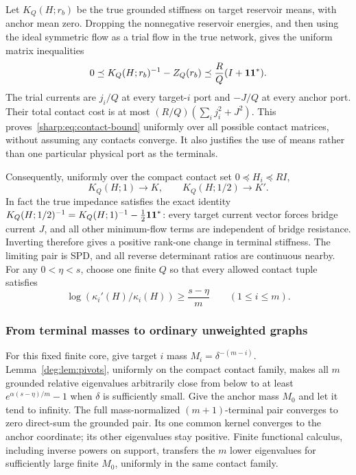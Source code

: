 Let $K_Q(H;r_b)$ be the true grounded stiffness on target reservoir
means, with anchor mean zero. Dropping the nonnegative reservoir
energies, and then using the ideal symmetric flow as a trial flow in
the true network, gives the uniform matrix inequalities
\begin{equation}\label{sharp:eq:contact-bound}
 0\preceq K_Q(H;r_b)^{-1}-Z_Q(r_b)
             \preceq\frac RQ(I+\boldsymbol 1\boldsymbol 1^*).
\end{equation}
The trial currents are $j_i/Q$ at every target-$i$ port and $-J/Q$
at every anchor port. Their total contact cost is at most
$(R/Q)(\sum_i j_i^2+J^2)$. This proves~\eqref{sharp:eq:contact-bound}
uniformly over all possible contact matrices, without assuming any
contacts converge. It also justifies the use of means rather than
one particular physical port as the terminals.

Consequently, uniformly over the compact contact set
$0\preceq H_i\preceq RI$,
\[
 K_Q(H;1)\longrightarrow K,\qquad K_Q(H;1/2)\longrightarrow K'.
\]
In fact the true impedance satisfies the exact identity
$K_Q(H;1/2)^{-1}=K_Q(H;1)^{-1}-\tfrac12\boldsymbol 1\boldsymbol 1^*$:
every target current vector forces bridge current $J$, and all other
minimum-flow terms are independent of bridge resistance. Inverting
therefore gives a positive rank-one change in terminal stiffness.
The limiting pair is SPD, and
all reverse determinant ratios are continuous nearby. For any
$0<\eta<s$, choose one finite $Q$ so that every allowed contact tuple
satisfies
\begin{equation}\label{sharp:eq:almost-pivots}
 \log(\kappa_i'(H)/\kappa_i(H))\ge\frac{s-\eta}{m}
                              \qquad(1\le i\le m).
\end{equation}

\subsubsection{From terminal masses to ordinary unweighted graphs}
For this fixed finite core, give target $i$ mass
$M_i=\delta^{-(m-i)}$. Lemma~\ref{deg:lem:pivots}, uniformly on the compact
contact family, makes all $m$ grounded relative eigenvalues arbitrarily
close from below to at least $e^{\alpha(s-\eta)/m}-1$ when $\delta$
is sufficiently small. Give the anchor mass $M_0$ and let it tend to
infinity. The full mass-normalized $(m+1)$-terminal pair converges to
zero direct-sum the grounded pair. Its one common kernel converges to
the anchor coordinate; its other eigenvalues stay positive. Finite
functional calculus, including inverse powers on support, transfers
the $m$ lower eigenvalues for sufficiently large finite $M_0$, uniformly
in the same contact family.

